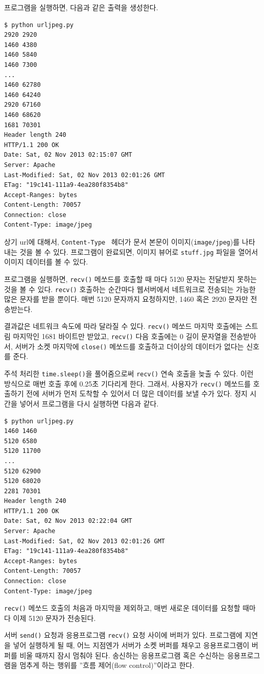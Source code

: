 프로그램을 실행하면, 다음과 같은 출력을 생성한다.

\beforeverb
\begin{verbatim}
$ python urljpeg.py 
2920 2920
1460 4380
1460 5840
1460 7300
...
1460 62780
1460 64240
2920 67160
1460 68620
1681 70301
Header length 240
HTTP/1.1 200 OK
Date: Sat, 02 Nov 2013 02:15:07 GMT
Server: Apache
Last-Modified: Sat, 02 Nov 2013 02:01:26 GMT
ETag: "19c141-111a9-4ea280f8354b8"
Accept-Ranges: bytes
Content-Length: 70057
Connection: close
Content-Type: image/jpeg
\end{verbatim}
\afterverb
%
상기 url에 대해서, {\tt Content-Type } 헤더가 문서 본문이 이미지({\tt image/jpeg})를 나타내는 것을 볼 수 있다.
프로그램이 완료되면, 이미지 뷰어로 {\tt stuff.jpg} 파일을 열어서 이미지 데이터를 볼 수 있다.

프로그램을 실행하면, {\tt recv()} 메쏘드를 호출할 때 마다 5120 문자는 전달받지 못하는 것을 볼 수 있다.
{\tt recv()} 호출하는 순간마다 웹서버에서 네트워크로 전송되는 가능한 많은 문자를 받을 뿐이다. 
매번 5120 문자까지 요청하지만, 1460 혹은 2920 문자만 전송받는다. 

결과값은 네트워크 속도에 따라 달라질 수 있다. 
{\tt recv()} 메쏘드 마지막 호출에는 스트림 마지막인 1681 바이트만 받았고,
{\tt recv()} 다음 호출에는 0 길이 문자열을 전송받아서, 서버가 소켓 마지막에 {\tt close()} 메쏘드를 호출하고 
더이상의 데이터가 없다는 신호를 준다.


주석 처리한 {\tt time.sleep()}을 풀어줌으로써 {\tt recv()} 연속 호출을 늦출 수 있다.
이런 방식으로 매번 호출 후에 0.25초 기다리게 한다.
그래서, 사용자가 {\tt recv()} 메쏘드를 호출하기 전에 서버가 먼저 도착할 수 있어서 더 많은 데이터를 보낼 수가 있다.
정지 시간을 넣어서 프로그램을 다시 실행하면 다음과 같다.

\beforeverb
\begin{verbatim}
$ python urljpeg.py 
1460 1460
5120 6580
5120 11700
...
5120 62900
5120 68020
2281 70301
Header length 240
HTTP/1.1 200 OK
Date: Sat, 02 Nov 2013 02:22:04 GMT
Server: Apache
Last-Modified: Sat, 02 Nov 2013 02:01:26 GMT
ETag: "19c141-111a9-4ea280f8354b8"
Accept-Ranges: bytes
Content-Length: 70057
Connection: close
Content-Type: image/jpeg
\end{verbatim}
\afterverb
%

{\tt recv()} 메쏘드 호출의 처음과 마지막을 제외하고, 매번 새로운 데이터를 요청할 때마다 이제 5120 문자가 전송된다.

서버 {\tt send()} 요청과 응용프로그램 {\tt recv()} 요청 사이에 버퍼가 있다.
프로그램에 지연을 넣어 실행하게 될 때, 어느 지점엔가 서버가 소켓 버퍼를 채우고 응용프로그램이 버퍼를 비울 때까지 잠시 멈춰야 된다. 
송신하는 응용프로그램 혹은 수신하는 응용프로그램을 멈추게 하는 행위를 ''흐름 제어(flow control)''이라고 한다.

